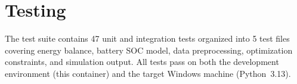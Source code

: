 \section{Testing}

The test suite contains 47 unit and integration tests organized into 5 test files covering energy balance, battery SOC model, data preprocessing, optimization constraints, and simulation output. All tests pass on both the development environment (this container) and the target Windows machine (Python~3.13).
